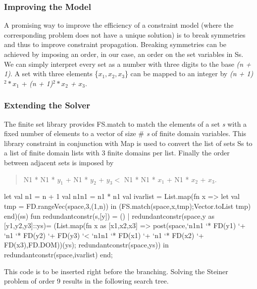\documentclass[a4paper,halfparskip]{scrartcl}
\begin{document}
\subsubsection{Improving the Model}
A promising way to improve the efficiency of a constraint
 model (where the corresponding problem does not have a 
unique solution) is to break symmetries and thus to improve 
constraint propagation. Breaking symmetries can be achieved 
by imposing an order, in our case, an order on the set variables 
in Ss. We can simply interpret every set as a number with 
three digits to the base \emph{(n + 1)}. A set with three elements 
\{\emph{$x_1, x_2, x_3$}\} can be mapped to an integer by 
\emph{(n + 1)}\emph{$^2 * x_1$} + \emph{(n + 1)}\emph{$^2 * x_2$ + $x_3$}. 

\subsubsection{Extending the Solver}
The finite set library provides 
FS.match to match 
the elements of a set \emph{s} with a fixed number of elements 
to a vector of size \emph{$\#$ s} of finite domain variables. This 
library constraint in conjunction with Map is used to 
convert the list of sets Ss to a list of finite domain 
lists with 3 finite domains per list. Finally the order 
between adjacent sets is imposed by 
\begin{quote}
N1 * N1 * $y_1$ + N1 * $y_2$ + $y_3 < $ N1 * N1 * $x_1$ + N1 * $x_2$ + $x_3$.
\end{quote}
\begin{myverbatim}
let 
    val n1 = n + 1
    val n1n1 = n1 * n1
    val ivarlist = List.map(fn x => 
    let 
       val tmp = FD.rangeVec(space,3,(1,n))
     in
       (FS.match(space,x,tmp);Vector.toList tmp)
    end)(ss)
    fun redundantconstr(s,[y]) = ()
      | redundantconstr(space,y as [y1,y2,y3]::ys)= 
             (List.map(fn x as [x1,x2,x3] =>
                 post(space,`n1n1 `* FD(y1) `+ `n1 `* FD(y2) `+
                            FD(y3) `< `n1n1 `* FD(x1) `+ `n1 `* 
                            FD(x2) `+ FD(x3),FD.DOM))(ys);
              redundantconstr(space,ys))       
 in
    redundantconstr(space,ivarlist)
end;
\end{myverbatim}

This code is to be inserted right before the branching. 
Solving the Steiner problem of order 9 results in the following 
search tree. 
\end{document}
